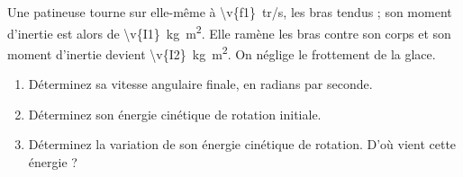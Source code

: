 Une patineuse tourne sur elle-même à \qty{\v{f1}}{tr/s}, les bras tendus ; son moment d'inertie est alors de \qty{\v{I1}}{kg.m^2}. Elle ramène les bras contre son corps et son moment d'inertie devient \qty{\v{I2}}{kg.m^2}. On néglige le frottement de la glace.

\begin{enumerate}[label=\alph*)]
    \item Déterminez sa vitesse angulaire finale, en radians par seconde.
    \item Déterminez son énergie cinétique de rotation initiale.
    \item Déterminez la variation de son énergie cinétique de rotation. D'où vient cette énergie ?
\end{enumerate}
